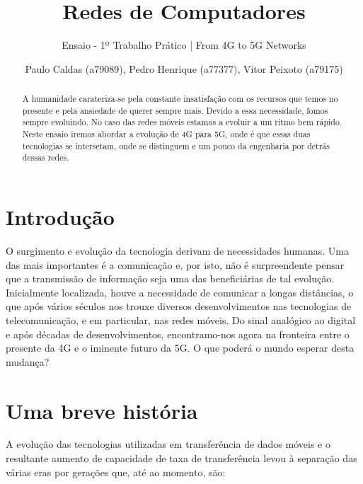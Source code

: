 \documentclass{llncs}
\begin{document}
\title{Redes de Computadores}
\subtitle{Ensaio - 1º Trabalho Prático | From 4G to 5G Networks}

\author{Paulo Caldas (a79089), Pedro Henrique (a77377), Vitor Peixoto (a79175)}




\maketitle              %

\begin{abstract}

    A humanidade carateriza-se pela constante insatisfação com os recursos que temos no presente e pela ansiedade de querer sempre mais. Devido a essa necessidade, fomos sempre evoluindo. No caso das redes móveis estamos a evoluir a um ritmo bem rápido. Neste ensaio iremos abordar a evolução de 4G para 5G, onde é que essas duas tecnologias se intersetam, onde se distinguem e um pouco da engenharia por detrás dessas redes.

\end{abstract}

\section{Introdução}

O surgimento e evolução da tecnologia derivam de necessidades humanas. Uma das mais importantes é a comunicação e, por isto, não é surpreendente pensar que a transmissão de informação seja uma das beneficiárias de tal evolução. Inicialmente localizada, houve a necessidade de comunicar a longas distâncias, o que após vários séculos nos trouxe diversos desenvolvimentos nas tecnologias de telecomunicação, e em particular, nas redes móveis. Do sinal analógico ao digital e após décadas de desenvolvimentos, encontramo-nos agora na fronteira entre o presente da 4G e o iminente futuro da 5G. O que poderá o mundo esperar desta mudança?

\section{Uma breve história}
\hspace*{1.5em}A evolução das tecnologias utilizadas em transferência de dados móveis e o resultante aumento de capacidade de taxa de transferência levou à separação das várias eras por gerações que, até ao momento, são:
\end{document}
